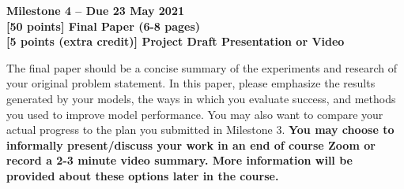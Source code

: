 \clearpage

\large
\textbf{Milestone 4 -- Due 23 May 2021}\\

\textbf{[50 points] Final Paper (6-8 pages)}\\
\textbf{[5 points (extra credit)] Project Draft Presentation or Video}


\normalsize

The final paper should be a concise summary of the experiments and research of your original problem statement. In this paper, please emphasize the results generated by your models, the ways in which you evaluate success, and methods you used to improve model performance. You may also want to compare your actual progress to the plan you submitted in Milestone 3. \textbf{You may choose to informally present/discuss your work in an end of course Zoom or record a 2-3 minute video summary. More information will be provided about these options later in the course.} \vspace{\baselineskip}

